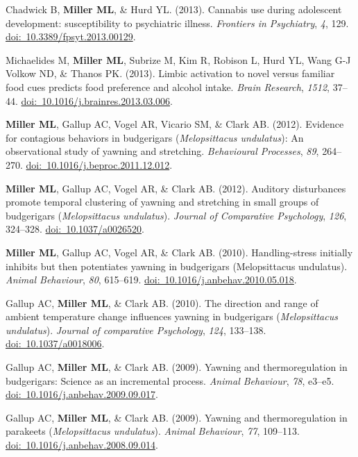 \documentclass[10pt]{article}
\begin{document}
\begin{description}
\item Chadwick B, \textbf{Miller ML}, \& Hurd YL. (2013). Cannabis use during adolescent development: susceptibility to psychiatric illness. \textit{Frontiers in Psychiatry}, \textit{4}, 129. \href{https://doi.org/10.3389/fpsyt.2013.00129}{doi:~10.3389/fpsyt.2013.00129}.
\item Michaelides M, \textbf{Miller ML}, Subrize M, Kim R, Robison L, Hurd YL, Wang G-J Volkow ND, \& Thanos PK. (2013). Limbic activation to novel versus familiar food cues predicts food preference and alcohol intake. \textit{Brain Research}, \textit{1512}, 37--44. \href{https://doi.org/10.1016/j.brainres.2013.03.006}{doi:~10.1016/j.brainres.2013.03.006}.
\item \textbf{Miller ML}, Gallup AC, Vogel AR, Vicario SM, \& Clark AB. (2012). Evidence for contagious behaviors in budgerigars (\textit{Melopsittacus undulatus}): An observational study of yawning and stretching. \textit{Behavioural Processes}, \textit{89}, 264--270. \href{https://doi.org/10.1016/j.beproc.2011.12.012}{doi:~10.1016/j.beproc.2011.12.012}.
\item \textbf{Miller ML}, Gallup AC, Vogel AR, \& Clark AB. (2012). Auditory disturbances promote temporal clustering of yawning and stretching in small groups of budgerigars (\textit{Melopsittacus undulatus}). \textit{Journal of Comparative Psychology}, \textit{126}, 324--328. \href{https://doi.org/10.1037/a0026520}{doi:~10.1037/a0026520}.
\item \textbf{Miller ML}, Gallup AC, Vogel AR, \& Clark AB. (2010). Handling-stress initially inhibits but then potentiates yawning in budgerigars (Melopsittacus undulatus). \textit{Animal Behaviour}, \textit{80}, 615--619. \href{https://doi.org/10.1016/j.anbehav.2010.05.018}{doi:~10.1016/j.anbehav.2010.05.018}.
\item Gallup AC, \textbf{Miller ML}, \& Clark AB. (2010). The direction and range of ambient temperature change influences yawning in budgerigars (\textit{Melopsittacus undulatus}). \textit{Journal of comparative Psychology}, \textit{124}, 133--138. \href{https://doi.org/10.1037/a0018006}{doi:~10.1037/a0018006}.
\item Gallup AC, \textbf{Miller ML}, \& Clark AB. (2009). Yawning and thermoregulation in budgerigars: Science as an incremental process. \textit{Animal Behaviour}, \textit{78}, e3--e5. \href{https://doi.org/10.1016/j.anbehav.2009.09.017}{doi:~10.1016/j.anbehav.2009.09.017}.
\item Gallup AC, \textbf{Miller ML}, \& Clark AB. (2009). Yawning and thermoregulation in parakeets (\textit{Melopsittacus undulatus}). \textit{Animal Behaviour}, \textit{77}, 109--113. \href{https://doi.org/10.1016/j.anbehav.2008.09.014}{doi:~10.1016/j.anbehav.2008.09.014}.
\end{description}
\end{document}
